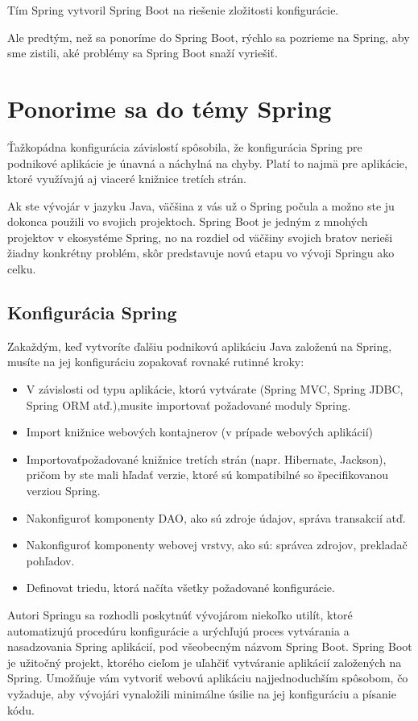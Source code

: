 \documentclass[12pt, letterpaper]{article}
\begin{document}
Tím Spring vytvoril Spring Boot na riešenie zložitosti konfigurácie. 

Ale predtým, než sa ponoríme do Spring Boot, rýchlo sa pozrieme na Spring, aby sme zistili, aké problémy sa Spring Boot snaží vyriešiť.\\
\newpage

\section{Ponorime sa do témy Spring}	
Ťažkopádna konfigurácia závislostí spôsobila, že konfigurácia Spring pre podnikové aplikácie je únavná a náchylná na chyby. Platí to najmä pre aplikácie, ktoré využívajú aj viaceré knižnice tretích strán.	

	Ak ste vývojár v jazyku Java, väčšina z vás už o Spring počula a možno ste ju dokonca použili vo svojich projektoch. Spring Boot je jedným z mnohých projektov v ekosystéme Spring, no na rozdiel od väčšiny svojich bratov nerieši žiadny konkrétny problém, skôr predstavuje novú etapu vo vývoji Springu ako celku.
	\subsection{Konfigurácia Spring}
	Zakaždým, keď vytvoríte ďalšiu podnikovú aplikáciu Java založenú na Spring, musíte na jej konfiguráciu zopakovať rovnaké rutinné kroky:
	
	\begin{itemize}
		\item V závislosti od typu aplikácie, ktorú vytvárate (Spring MVC, Spring JDBC, Spring ORM atď.),musite importovať požadované moduly Spring.
		\item Import knižnice webových kontajnerov (v prípade webových aplikácií)
		\item Importovaťpožadované knižnice tretích strán (napr. Hibernate, Jackson), pričom by ste mali hľadať verzie, ktoré sú kompatibilné so špecifikovanou verziou Spring.
		\item Nakonfiguroť komponenty DAO, ako sú zdroje údajov, správa transakcií atď.
		\item Nakonfiguroť komponenty webovej vrstvy, ako sú: správca zdrojov, prekladač pohľadov.
		\item Definovat triedu, ktorá načíta všetky požadované konfigurácie.
	\end{itemize}
	
	Autori Springu sa rozhodli poskytnúť vývojárom niekoľko utilít, ktoré automatizujú procedúru konfigurácie a urýchľujú proces vytvárania a nasadzovania Spring aplikácií, pod všeobecným názvom Spring Boot. Spring Boot je užitočný projekt, ktorého cieľom je uľahčiť vytváranie aplikácií založených na Spring. Umožňuje vám vytvoriť webovú aplikáciu najjednoduchším spôsobom, čo vyžaduje, aby vývojári vynaložili minimálne úsilie na jej konfiguráciu a písanie kódu.
\newpage
\end{document}
